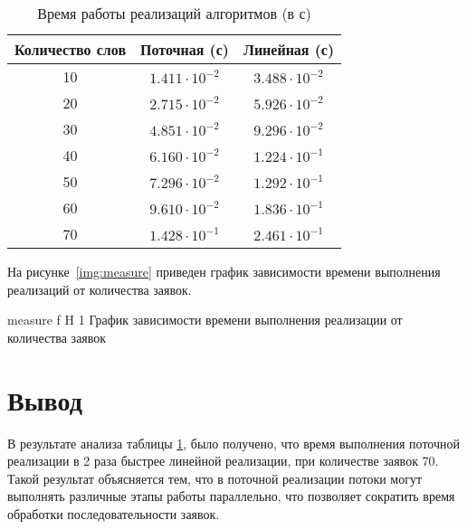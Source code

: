 \begin{table}[H]
	\begin{center}
		\begin{threeparttable}
			\captionsetup{justification=raggedright,singlelinecheck=off}
			\caption{Время работы реализаций алгоритмов (в с)}
			\label{tbl:time_measurements}
			\begin{tabular}{|c|c|c|}
				\hline
				Количество слов & Поточная (с) & Линейная (с) \\
			\hline
			10 &$ 1.411\cdot 10^{-2} $&$ 3.488\cdot 10^{-2}$\\
			\hline
			20 &$ 2.715\cdot 10^{-2} $&$ 5.926\cdot 10^{-2}$\\
			\hline
			30 &$ 4.851\cdot 10^{-2} $&$ 9.296\cdot 10^{-2}$\\
			\hline
			40 &$ 6.160\cdot 10^{-2} $&$ 1.224\cdot 10^{-1}$\\
			\hline
			50 &$ 7.296\cdot 10^{-2} $&$ 1.292\cdot 10^{-1}$\\
			\hline
			60 &$ 9.610\cdot 10^{-2} $&$ 1.836\cdot 10^{-1}$\\
			\hline
			70 &$ 1.428\cdot 10^{-1} $&$ 2.461\cdot 10^{-1}$\\
			\hline
			\end{tabular}
		\end{threeparttable}
	\end{center}
\end{table}


На рисунке~\ref{img:measure} приведен график зависимости времени выполнения реализаций от количества заявок. 

{measure} %
{f} %
{H} %
{1\textwidth} %
{График зависимости времени выполнения реализации от количества заявок} %

\section*{Вывод}

В результате анализа таблицы \ref{tbl:time_measurements}, было получено, что время выполнения поточной реализации в 2 раза быстрее линейной реализации, при количестве заявок 70. 
Такой результат объясняется тем, что в поточной реализации потоки могут выполнять различные этапы работы параллельно, что позволяет сократить время обработки последовательности заявок.

